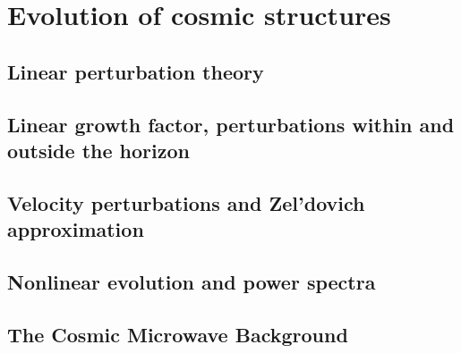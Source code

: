 \section{Evolution of cosmic structures}
\subsection{Linear perturbation theory}
\subsection{Linear growth factor, perturbations within and outside the horizon}
\subsection{Velocity perturbations and Zel'dovich approximation}
\subsection{Nonlinear evolution and power spectra}
\subsection{The Cosmic Microwave Background}
